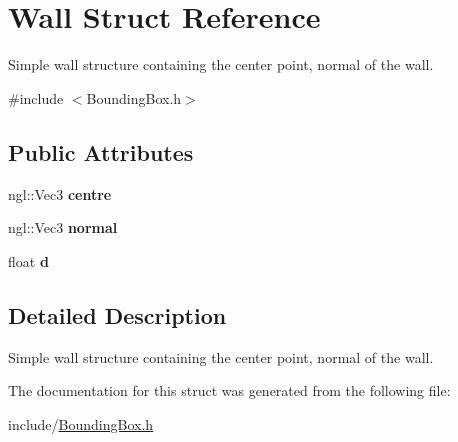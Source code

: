 \hypertarget{structWall}{}\section{Wall Struct Reference}
\label{structWall}


Simple wall structure containing the center point, normal of the wall.  




{\ttfamily \#include $<$Bounding\+Box.\+h$>$}

\subsection*{Public Attributes}
\begin{DoxyCompactItemize}
\item 
ngl\+::\+Vec3 {\bfseries centre}\hypertarget{structWall_aee57d6158d6d7380839d9615cd149deb}{}\label{structWall_aee57d6158d6d7380839d9615cd149deb}

\item 
ngl\+::\+Vec3 {\bfseries normal}\hypertarget{structWall_a001549604fc2b6d526c814d17eeb7e81}{}\label{structWall_a001549604fc2b6d526c814d17eeb7e81}

\item 
float {\bfseries d}\hypertarget{structWall_a2e62214f52d96f5e2516be239a6702f3}{}\label{structWall_a2e62214f52d96f5e2516be239a6702f3}

\end{DoxyCompactItemize}


\subsection{Detailed Description}
Simple wall structure containing the center point, normal of the wall. 

The documentation for this struct was generated from the following file\+:\begin{DoxyCompactItemize}
\item 
include/\hyperlink{BoundingBox_8h}{Bounding\+Box.\+h}\end{DoxyCompactItemize}
